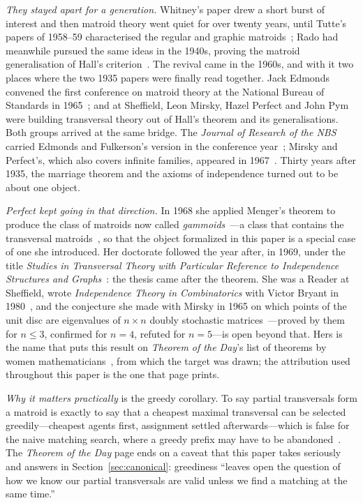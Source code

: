 \documentclass[11pt]{article}
\begin{document}
\emph{They stayed apart for a generation.} Whitney's paper drew a short burst of interest and then
matroid theory went quiet for over twenty years, until Tutte's papers of 1958--59 characterised the
regular and graphic matroids~\cite{farroxley}; Rado had meanwhile pursued the same ideas in the
1940s, proving the matroid generalisation of Hall's criterion~\cite{rado}. The revival came in the 1960s, and with it two
places where the two 1935 papers were finally read together. Jack Edmonds convened the first
conference on matroid theory at the National Bureau of Standards in 1965~\cite{oxleywelsh}; and at Sheffield, Leon
Mirsky, Hazel Perfect and John Pym were building transversal theory out of Hall's theorem and its
generalisations. Both groups arrived at the same bridge. The \emph{Journal of Research of the NBS}
carried Edmonds and Fulkerson's version in the conference year~\cite{edmondsfulkerson};
Mirsky and Perfect's, which also covers infinite families, appeared in 1967~\cite{mirskyperfect}.
Thirty years after 1935, the marriage theorem and the axioms of independence turned out to be
about one object.

\emph{Perfect kept going in that direction.} In 1968 she applied Menger's theorem to produce the
class of matroids now called \emph{gammoids}~\cite{perfect}---a class that contains the transversal
matroids~\cite{oxley,ingleton}, so that the object formalized in this paper is a special case of
one she introduced. Her doctorate followed the year after, in 1969, under the title \emph{Studies in
Transversal Theory with Particular Reference to Independence Structures and
Graphs}~\cite{perfectthesis}: the thesis came after the theorem. She was a Reader at Sheffield, wrote \emph{Independence Theory in
Combinatorics} with Victor Bryant in 1980~\cite{bryantperfect}, and the conjecture she made with
Mirsky in 1965 on which points of the unit disc are eigenvalues of $n\times n$ doubly stochastic
matrices~\cite{perfectmirsky}---proved by them for $n\le 3$, confirmed for $n=4$, refuted for
$n=5$---is open beyond that. Hers is the
name that puts this result on \emph{Theorem of the Day}'s list of theorems by women
mathematicians~\cite{totd}, from which the target was drawn; the attribution used throughout this
paper is the one that page prints.

\emph{Why it matters practically} is the greedy corollary. To say partial transversals form a
matroid is exactly to say that a cheapest maximal transversal can be selected greedily---cheapest
agents first, assignment settled afterwards---which is false for the naive matching search, where
a greedy prefix may have to be abandoned~\cite{totd}. The \emph{Theorem of the Day} page ends on
a caveat that this paper takes seriously and answers in Section~\ref{sec:canonical}: greediness
``leaves open the question of how we know our partial transversals are valid unless we find a
matching at the same time.''
\end{document}
